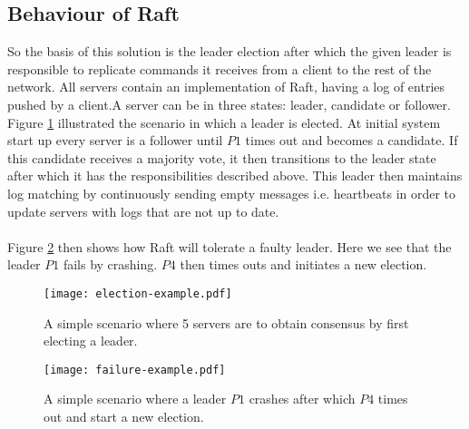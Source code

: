 \subsection{Behaviour of Raft}
So the basis of this solution is the leader election after which the given leader is responsible to replicate commands it receives from a client to the rest of the network. All servers contain an implementation of Raft, having a log of entries pushed by a client.A server can be in three states: leader, candidate or follower. Figure \ref{fig:election_example} illustrated the scenario in which a leader is elected. At initial system start up every server is a follower until $P1$ times out and becomes a candidate. If this candidate receives a majority vote, it then transitions to the leader state after which it has the responsibilities described above. This leader then maintains log matching by continuously sending empty messages i.e. heartbeats in order to update servers with logs that are not up to date. \\ \\
Figure \ref{fig:failure_example} then shows how Raft will tolerate a faulty leader. Here we see that the leader $P1$ fails by crashing. $P4$ then times outs and initiates a new election.

\begin{figure}[ht]
\centering
\texttt{[image: election-example.pdf]}
\caption{A simple scenario where 5 servers are to obtain consensus by first electing a leader.}
\label{fig:election_example}
\end{figure}

\begin{figure}[ht]
\centering
\texttt{[image: failure-example.pdf]}
\caption{A simple scenario where a leader $P1$ crashes after which $P4$ times out and start a new election.}
\label{fig:failure_example}
\end{figure}

